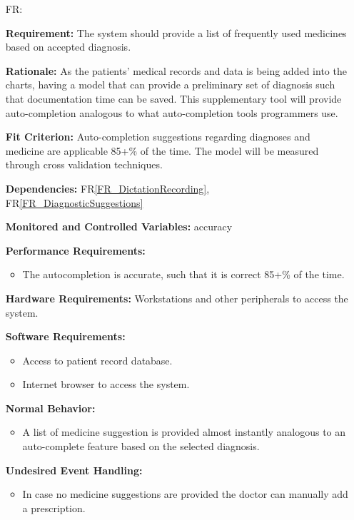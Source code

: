 \documentclass[12pt]{article}
\newcounter{reqnum} %
\begin{document}
\begin{itemize}
  
  \item[FR\refstepcounter{reqnum}\thereqnum \label{FR_medicalSuggestions}:] 
  
  \textbf{Requirement:} The system should provide a list of frequently used medicines based on accepted diagnosis.
  
  \textbf{Rationale:} As the patients' medical records and data is being added into the charts, having a model that can provide a preliminary set of diagnosis such that documentation time can be saved. This supplementary tool will provide auto-completion analogous to what auto-completion tools programmers use.
  
  \textbf{Fit Criterion:} Auto-completion suggestions regarding diagnoses and medicine are applicable 85+\% of the time. The model will be measured through cross validation techniques.
   
  \textbf{Dependencies:} FR\ref{FR_DictationRecording}, FR\ref{FR_DiagnosticSuggestions}
  
  \textbf{Monitored and Controlled Variables:} accuracy
  
  \textbf{Performance Requirements:}
  \begin{itemize}
    \item The autocompletion is accurate, such that it is correct 85+\% of the time. 
  \end{itemize}
  
  \textbf{Hardware Requirements:} 
  Workstations and other peripherals to access the system.
  
  \textbf{Software Requirements:}
  \begin{itemize}
    \item Access to patient record database.
    \item Internet browser to access the system. 
  \end{itemize}
  
  \textbf{Normal Behavior:}
  \begin{itemize}
    \item A list of medicine suggestion is provided almost instantly analogous to an auto-complete feature based on the selected diagnosis.
  \end{itemize}
  
  \textbf{Undesired Event Handling:}
  \begin{itemize}
    \item In case no medicine suggestions are provided the doctor can manually add a prescription.
  \end{itemize}


\end{itemize}
\end{document}
